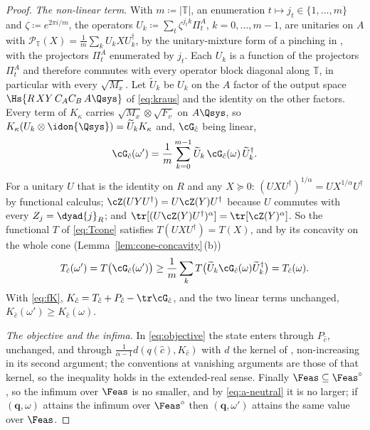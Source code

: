 \begin{proof}
\emph{The non-linear term.} With $m\coloneqq|\mathbb{T}|$, an enumeration
$t\mapsto j_t\in\{1,\dots,m\}$ and $\zeta\coloneqq e^{2\pi i/m}$, the
operators $U_k\coloneqq\sum_t\zeta^{j_tk}\Pi^{A}_t$, $k=0,\dots,m-1$, are
unitaries on $A$ with
$\mathcal{P}_{\mathbb{T}}(X)=\frac1m\sum_kU_kXU_k^{\dagger}$, by the
unitary-mixture form of a pinching in , with
the projectors $\Pi^{A}_t$ enumerated by $j_t$. Each $U_k$ is a function of the
projectors $\Pi^{A}_t$ and therefore commutes with every operator block
diagonal along $\mathbb{T}$, in particular with every $\sqrt{M_x}$. Let
$\widetilde U_k$ be $U_k$ on the $A$ factor of the output space
$\Hs{R\,XY\,C_AC_B\,A\Qsys}$ of \eqref{eq:kraus} and the identity on the other
factors. Every term of $K_{\kappa}$ carries
$\sqrt{M_x}\otimes\sqrt{F_v}$ on $A\Qsys$, so
$K_{\kappa}(U_k\otimes\idon{\Qsys})=\widetilde U_kK_{\kappa}$ and, $\cG_{\hat
c}$ being linear,
\begin{equation*}
  \cG_{\hat c}(\omega')=\frac1m\sum_{k=0}^{m-1}
  \widetilde U_k\,\cG_{\hat c}(\omega)\,\widetilde U_k^{\dagger}.
\end{equation*}
For a unitary $U$ that is the identity on $R$ and any $X\succeq0$:
$(UXU^{\dagger})^{1/\alpha}=UX^{1/\alpha}U^{\dagger}$ by functional calculus;
$\cZ(UYU^{\dagger})=U\cZ(Y)U^{\dagger}$ because $U$ commutes with every
$Z_j=\dyad{j}_R$; and
$\tr[(U\cZ(Y)U^{\dagger})^{\alpha}]=\tr[\cZ(Y)^{\alpha}]$. So the functional
$T$ of \eqref{eq:Tcone} satisfies $T(UXU^{\dagger})=T(X)$, and by its
concavity on the whole cone (Lemma~\ref{lem:cone-concavity}\,(b))
\begin{equation*}
  T_{\hat c}(\omega')=T\big(\cG_{\hat c}(\omega')\big)
  \ge\frac1m\sum_kT\big(\widetilde U_k\cG_{\hat c}(\omega)
  \widetilde U_k^{\dagger}\big)=T_{\hat c}(\omega).
\end{equation*}
With \eqref{eq:fK},
$K_{\hat c}=T_{\hat c}+P_{\hat c}-\tr\cG_{\hat c}$, and the two linear terms
unchanged, $K_{\hat c}(\omega')\ge K_{\hat c}(\omega)$.

\emph{The objective and the infima.} In \eqref{eq:objective} the state
enters through $P_{\hat c}$, unchanged, and through
$\frac{1}{\alpha-1}d(q(\hat c),K_{\hat c})$ with $d$ the kernel of
, non-increasing in its second argument; the
conventions at vanishing arguments are those of that kernel, so the
inequality holds in the extended-real sense. Finally
$\Feas\subseteq\Feas^{\circ}$, so the infimum over $\Feas$ is no smaller,
and by \eqref{eq:a-neutral} it is no larger; if $(\mathbf q,\omega)$ attains
the infimum over $\Feas^{\circ}$ then $(\mathbf q,\omega')$ attains the same
value over $\Feas$.
\end{proof}
